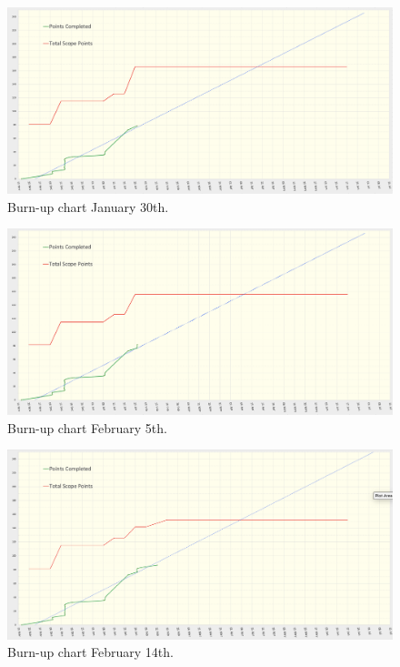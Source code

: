   \begin{figure}[H]
    \centering
    \includegraphics[width=12cm]{assets/outputs/burnups/01-30.png}
    \caption{Burn-up chart January 30th.}
    \label{fig:burnup2}
  \end{figure}

  \begin{figure}[H]
    \centering
    \includegraphics[width=12cm]{assets/outputs/burnups/02-05.png}
    \caption{Burn-up chart February 5th.}
    \label{fig:burnup3}
  \end{figure}

  \begin{figure}[H]
    \centering
    \includegraphics[width=12cm]{assets/outputs/burnups/02-14.png}
    \caption{Burn-up chart February 14th.}
    \label{fig:burnup4}
  \end{figure}

